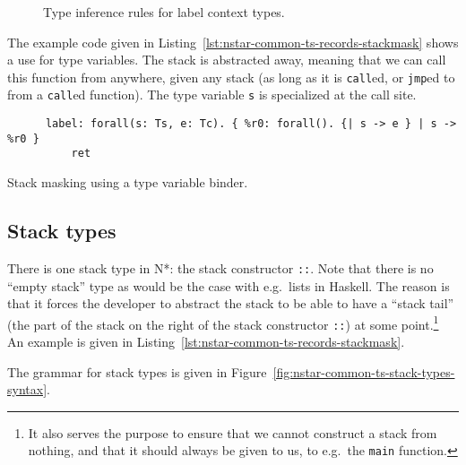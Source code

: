 \begin{figure}[htb]
  \centering

  \begin{prooftree}
  \end{prooftree}

  \caption{Type inference rules for label context types.}
  \label{fig:nstar-common-ts-label-types-typerules}
\end{figure}

The example code given in Listing~\ref{lst:nstar-common-ts-records-stackmask} shows a use for type variables.
The stack is abstracted away, meaning that we can call this function from anywhere, given any stack (as long as it is \texttt{call}ed, or \texttt{jmp}ed to from a \texttt{call}ed function).
The type variable \texttt{s} is specialized at the call site.

\begin{listing}[htb]
  \centering
  \begin{minipage}{0.90\textwidth}
    \begin{verbatim}
      label: forall(s: Ts, e: Tc). { %r0: forall(). {| s -> e } | s -> %r0 }
          ret
    \end{verbatim}
  \end{minipage}
  \caption{Stack masking using a type variable binder.}
  \label{lst:nstar-common-ts-records-stackmask}
\end{listing}

\subsection{Stack types}\label{subsec:nstar-common-ts-stack}

There is one stack type in N*: the stack constructor \texttt{::}.
Note that there is no ``empty stack'' type as would be the case with e.g.\ lists in Haskell.
The reason is that it forces the developer to abstract the stack to be able to have a ``stack tail'' (the part of the stack on the right of the stack constructor \texttt{::}) at some point.\footnote{It also serves the purpose to ensure that we cannot construct a stack from nothing, and that it should always be given to us, to e.g.\ the \texttt{main} function.}
An example is given in Listing~\ref{lst:nstar-common-ts-records-stackmask}.

The grammar for stack types is given in Figure~\ref{fig:nstar-common-ts-stack-types-syntax}.

